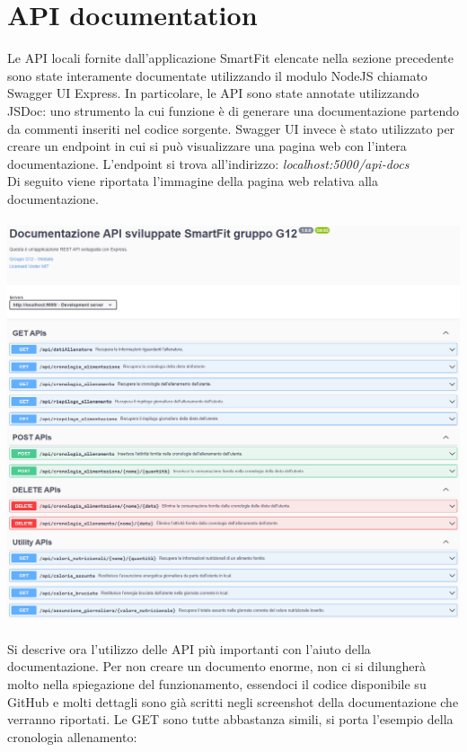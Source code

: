 \documentclass{article}
\begin{document}
   \section{API documentation}
   Le API locali fornite dall’applicazione SmartFit elencate nella sezione precedente sono state interamente documentate utilizzando il modulo NodeJS chiamato Swagger UI Express. In particolare, le API sono state annotate utilizzando JSDoc: uno strumento la cui funzione è di generare una documentazione partendo da commenti inseriti nel codice sorgente. Swagger UI invece è stato utilizzato per creare un endpoint in cui si può visualizzare una pagina web con l’intera documentazione.
   L’endpoint si trova all’indirizzo: \textit{localhost:5000/api-docs}\\
   Di seguito viene riportata l’immagine della pagina web relativa alla documentazione.\\
   \\
   \includegraphics[scale=0.5]{documentazione.png}\\
   \\
   Si descrive ora l’utilizzo delle API più importanti con l’aiuto della documentazione. Per non creare un documento enorme, non ci si dilungherà molto nella spiegazione del funzionamento, essendoci il codice disponibile su GitHub e molti dettagli sono già scritti negli screenshot della documentazione che verranno riportati.
   Le GET sono tutte abbastanza simili, si porta l’esempio della cronologia allenamento:\\
\end{document}
